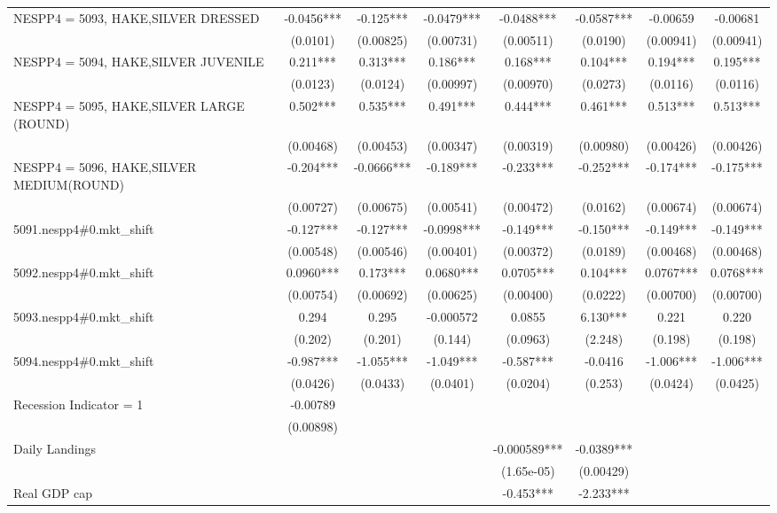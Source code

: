 \begin{tabular}{lccccccc}
NESPP4 = 5093, HAKE,SILVER DRESSED & -0.0456*** & -0.125*** & -0.0479*** & -0.0488*** & -0.0587*** & -0.00659 & -0.00681 \\
 & (0.0101) & (0.00825) & (0.00731) & (0.00511) & (0.0190) & (0.00941) & (0.00941) \\
NESPP4 = 5094, HAKE,SILVER JUVENILE & 0.211*** & 0.313*** & 0.186*** & 0.168*** & 0.104*** & 0.194*** & 0.195*** \\
 & (0.0123) & (0.0124) & (0.00997) & (0.00970) & (0.0273) & (0.0116) & (0.0116) \\
NESPP4 = 5095, HAKE,SILVER LARGE (ROUND) & 0.502*** & 0.535*** & 0.491*** & 0.444*** & 0.461*** & 0.513*** & 0.513*** \\
 & (0.00468) & (0.00453) & (0.00347) & (0.00319) & (0.00980) & (0.00426) & (0.00426) \\
NESPP4 = 5096, HAKE,SILVER MEDIUM(ROUND) & -0.204*** & -0.0666*** & -0.189*** & -0.233*** & -0.252*** & -0.174*** & -0.175*** \\
 & (0.00727) & (0.00675) & (0.00541) & (0.00472) & (0.0162) & (0.00674) & (0.00674) \\
5091.nespp4\#0.mkt\_shift & -0.127*** & -0.127*** & -0.0998*** & -0.149*** & -0.150*** & -0.149*** & -0.149*** \\
 & (0.00548) & (0.00546) & (0.00401) & (0.00372) & (0.0189) & (0.00468) & (0.00468) \\
5092.nespp4\#0.mkt\_shift & 0.0960*** & 0.173*** & 0.0680*** & 0.0705*** & 0.104*** & 0.0767*** & 0.0768*** \\
 & (0.00754) & (0.00692) & (0.00625) & (0.00400) & (0.0222) & (0.00700) & (0.00700) \\
5093.nespp4\#0.mkt\_shift & 0.294 & 0.295 & -0.000572 & 0.0855 & 6.130*** & 0.221 & 0.220 \\
 & (0.202) & (0.201) & (0.144) & (0.0963) & (2.248) & (0.198) & (0.198) \\
5094.nespp4\#0.mkt\_shift & -0.987*** & -1.055*** & -1.049*** & -0.587*** & -0.0416 & -1.006*** & -1.006*** \\
 & (0.0426) & (0.0433) & (0.0401) & (0.0204) & (0.253) & (0.0424) & (0.0425) \\
Recession Indicator = 1 & -0.00789 &  &  &  &  &  &  \\
 & (0.00898) &  &  &  &  &  &  \\
Daily Landings &  &  &  & -0.000589*** & -0.0389*** &  &  \\
 &  &  &  & (1.65e-05) & (0.00429) &  &  \\
Real GDP cap &  &  &  & -0.453*** & -2.233*** &  &  \\

\end{tabular}
